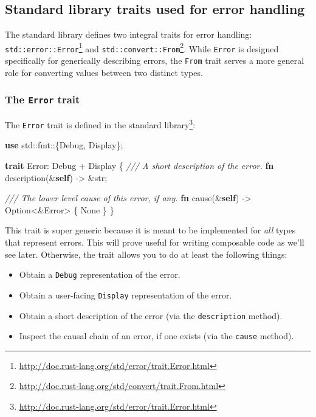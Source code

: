 \documentclass[a4paper,]{book}
\newenvironment{Shaded}{\begin{snugshade}}{\end{snugshade}}
\newcommand{\KeywordTok}[1]{\textcolor[rgb]{0.13,0.29,0.53}{\textbf{{#1}}}}
\newcommand{\DataTypeTok}[1]{\textcolor[rgb]{0.13,0.29,0.53}{{#1}}}
\newcommand{\ConstantTok}[1]{\textcolor[rgb]{0.00,0.00,0.00}{{#1}}}
\newcommand{\CommentTok}[1]{\textcolor[rgb]{0.56,0.35,0.01}{\textit{{#1}}}}
\newcommand{\BuiltInTok}[1]{{#1}}
\newcommand{\NormalTok}[1]{{#1}}
\renewcommand{\href}[2]{#2\footnote{\url{#1}}}
\providecommand{\tightlist}{%
  \setlength{\itemsep}{0pt}\setlength{\parskip}{0pt}}
\begin{document}
\hypertarget{standard-library-traits-used-for-error-handling}{\subsection{Standard
library traits used for error
handling}\label{standard-library-traits-used-for-error-handling}}

The standard library defines two integral traits for error handling:
\href{http://doc.rust-lang.org/std/error/trait.Error.html}{\texttt{std::error::Error}}
and
\href{http://doc.rust-lang.org/std/convert/trait.From.html}{\texttt{std::convert::From}}.
While \texttt{Error} is designed specifically for generically describing
errors, the \texttt{From} trait serves a more general role for
converting values between two distinct types.

\hypertarget{the-error-trait}{\subsubsection{\texorpdfstring{The
\texttt{Error} trait}{The Error trait}}\label{the-error-trait}}

The \texttt{Error} trait is
\href{http://doc.rust-lang.org/std/error/trait.Error.html}{defined in
the standard library}:

\begin{Shaded}
\begin{Highlighting}[]
\KeywordTok{use} \NormalTok{std::fmt::\{}\BuiltInTok{Debug}\NormalTok{, }\BuiltInTok{Display}\NormalTok{\};}

\KeywordTok{trait} \NormalTok{Error: }\BuiltInTok{Debug} \NormalTok{+ }\BuiltInTok{Display} \NormalTok{\{}
  \CommentTok{/// A short description of the error.}
  \KeywordTok{fn} \NormalTok{description(&}\KeywordTok{self}\NormalTok{) -> &}\DataTypeTok{str}\NormalTok{;}

  \CommentTok{/// The lower level cause of this error, if any.}
  \KeywordTok{fn} \NormalTok{cause(&}\KeywordTok{self}\NormalTok{) -> }\DataTypeTok{Option}\NormalTok{<&Error> \{ }\ConstantTok{None} \NormalTok{\}}
\NormalTok{\}}
\end{Highlighting}
\end{Shaded}

This trait is super generic because it is meant to be implemented for
\emph{all} types that represent errors. This will prove useful for
writing composable code as we'll see later. Otherwise, the trait allows
you to do at least the following things:

\begin{itemize}
\tightlist
\item
  Obtain a \texttt{Debug} representation of the error.
\item
  Obtain a user-facing \texttt{Display} representation of the error.
\item
  Obtain a short description of the error (via the \texttt{description}
  method).
\item
  Inspect the causal chain of an error, if one exists (via the
  \texttt{cause} method).
\end{itemize}
\end{document}
